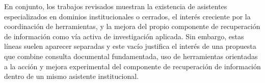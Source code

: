 En conjunto, los trabajos revisados muestran la existencia de asistentes especializados en dominios institucionales o cerrados, el interés creciente por la coordinación de herramientas, y la mejora del propio componente de recuperación de información como vía activa de investigación aplicada. 
Sin embargo, estas líneas suelen aparecer separadas y este vacío justifica el interés de una propuesta que combine consulta documental fundamentada, uso de herramientas orientadas a la acción y mejora experimental del componente de recuperación de información dentro de un mismo asistente institucional.
